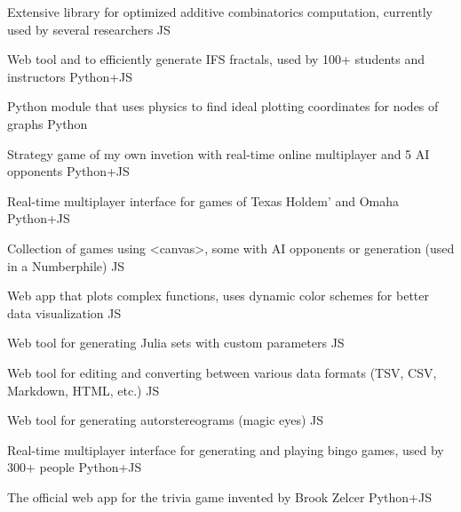 

\begin{cvprojects}
  
  \cvproject
  {}
  {Extensive library for optimized additive combinatorics computation, currently used by several researchers}
  {JS}

  \cvproject
  {}
  {Web tool and  to efficiently generate IFS fractals, used by 100+ students and instructors}
  {Python+JS}

  \cvproject
  {}
  {Python module that uses physics to find ideal plotting coordinates for nodes of graphs}
  {Python}

  \cvproject
  {}
  {Strategy game of my own invetion with real-time online multiplayer and 5 AI opponents}
  {Python+JS}

  \cvproject
  {}
  {Real-time multiplayer interface for games of Texas Holdem' and Omaha}
  {Python+JS}

  \cvproject
  {}
  {Collection of games using <canvas>, some with AI opponents or generation (used in a Numberphile)}
  {JS}

  \cvproject
  {}
  {Web app that plots complex functions, uses dynamic color schemes for better data visualization}
  {JS}

  \cvproject
  {}
  {Web tool for generating Julia sets with custom parameters}
  {JS}
  
  \cvproject
  {}
  {Web tool for editing and converting between various data formats (TSV, CSV, Markdown, HTML, etc.)}
  {JS}

  \cvproject
  {}
  {Web tool for generating autorstereograms (magic eyes)}
  {JS}

  \cvproject
  {}
  {Real-time multiplayer interface for generating and playing bingo games, used by 300+ people}
  {Python+JS}

  \cvproject
  {}
  {The official web app for the trivia game invented by Brook Zelcer}
  {Python+JS}



\end{cvprojects}














